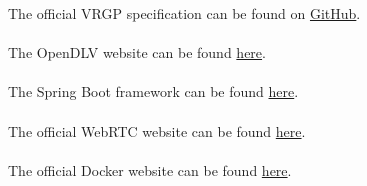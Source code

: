 The official VRGP specification can be found on \href{https://github.com/aboamare/vrgp-specifications/blob/master/Protocol\%20specification.md}{GitHub}.
\\\\
The OpenDLV website can be found \href{https://opendlv.org}{here}. 
\\\\
The Spring Boot framework can be found \href{https://spring.io/projects/spring-boot}{here}.
\\\\
The official WebRTC website can be found \href{https://webrtc.org/}{here}.
\\\\
The official Docker website can be found \href{https://www.docker.com/}{here}.
